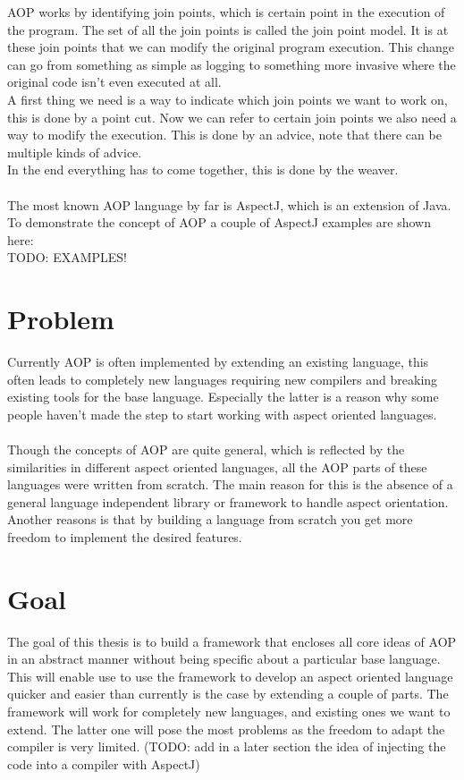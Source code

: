 \documentclass[a4paper]{report}
\begin{document}
AOP works by identifying join points, which is certain point in the execution of the program. The set of all the join points is called the join point model. It is at these join points that we can modify the original program execution. This change can go from something as simple as logging to something more invasive where the original code isn't even executed at all.\\
A first thing we need is a way to indicate which join points we want to work on, this is done by a point cut. Now we can refer to certain join points we also need a way to modify the execution. This is done by an advice, note that there can be multiple kinds of advice.\\
In the end everything has to come together, this is done by the weaver.\\
\\
The most known AOP language by far is AspectJ, which is an extension of Java. To demonstrate the concept of AOP a couple of AspectJ examples are shown here:\\
TODO: EXAMPLES!\\

\section{Problem}
Currently AOP is often implemented by extending an existing language, this often leads to completely new languages requiring new compilers and  breaking existing tools for the base language. Especially the latter is a reason why some people haven't made the step to start working with aspect oriented languages.\\
\\
Though the concepts of AOP are quite general, which is reflected by the similarities in different aspect oriented languages, all the AOP parts of these languages were written from scratch. The main reason for this is the absence of a general language independent library or framework to handle aspect orientation. Another reasons is that by building a language from scratch you get more freedom to implement the desired features.

\section{Goal}
The goal of this thesis is to build a framework that encloses all core ideas of AOP in an abstract manner without being specific about a particular base language. This will enable use to use the framework to develop an aspect oriented language quicker and easier than currently is the case by extending a couple of parts. The framework will work for completely new languages, and existing ones we want to extend. The latter one will pose the most problems as the freedom to adapt the compiler is very limited. (TODO: add in a later section the idea of injecting the code into a compiler with AspectJ)
\end{document}
